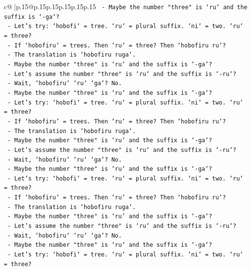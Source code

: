 \documentclass{article}
\begin{document}
{\begin{supertabular}{c@{$\;$}|p{.15\linewidth}@{}p{.15\linewidth}p{.15\linewidth}p{.15\linewidth}p{.15\linewidth}p{.15\linewidth}}
{{{\texttt{    {-} Maybe the number "three" is `ru` and the suffix is `{-}ga`?} \\
\texttt{    {-} Let's try: `hobofi` = tree. `ru` = plural suffix. `ni` = two. `ru` = three?} \\
\texttt{    {-} If `hobofiru` = trees. Then `ru` = three? Then `hobofiru ru`?} \\
\texttt{    {-} The translation is `hobofiru ruga`.} \\
\texttt{    {-} Maybe the number "three" is `ru` and the suffix is `{-}ga`?} \\
\texttt{    {-} Let's assume the number "three" is `ru` and the suffix is `{-}ru`?} \\
\texttt{    {-} Wait, `hobofiru` `ru` `ga`? No.} \\
\texttt{    {-} Maybe the number "three" is `ru` and the suffix is `{-}ga`?} \\
\texttt{    {-} Let's try: `hobofi` = tree. `ru` = plural suffix. `ni` = two. `ru` = three?} \\
\texttt{    {-} If `hobofiru` = trees. Then `ru` = three? Then `hobofiru ru`?} \\
\texttt{    {-} The translation is `hobofiru ruga`.} \\
\texttt{    {-} Maybe the number "three" is `ru` and the suffix is `{-}ga`?} \\
\texttt{    {-} Let's assume the number "three" is `ru` and the suffix is `{-}ru`?} \\
\texttt{    {-} Wait, `hobofiru` `ru` `ga`? No.} \\
\texttt{    {-} Maybe the number "three" is `ru` and the suffix is `{-}ga`?} \\
\texttt{    {-} Let's try: `hobofi` = tree. `ru` = plural suffix. `ni` = two. `ru` = three?} \\
\texttt{    {-} If `hobofiru` = trees. Then `ru` = three? Then `hobofiru ru`?} \\
\texttt{    {-} The translation is `hobofiru ruga`.} \\
\texttt{    {-} Maybe the number "three" is `ru` and the suffix is `{-}ga`?} \\
\texttt{    {-} Let's assume the number "three" is `ru` and the suffix is `{-}ru`?} \\
\texttt{    {-} Wait, `hobofiru` `ru` `ga`? No.} \\
\texttt{    {-} Maybe the number "three" is `ru` and the suffix is `{-}ga`?} \\
\texttt{    {-} Let's try: `hobofi` = tree. `ru` = plural suffix. `ni` = two. `ru` = three?} \\
}}}
\end{supertabular}}
\end{document}
